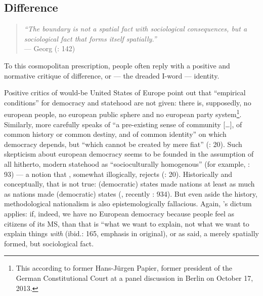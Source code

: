 \subsection[Difference]{Difference} \label{sec:ID-Difference} 

\begin{quote}
	\emph{``The boundary is not a spatial fact with sociological consequences, but a sociological fact that forms itself spatially.''} \\
	--- Georg \citeauthor{Simmel1903} (\citeyear{Simmel1903}: 142)
\end{quote}

To this cosmopolitan prescription, people often reply with a positive and normative critique of difference, or --- the dreaded I-word --- identity. 

Positive critics of would-be United States of Europe point out that ``empirical conditions'' for democracy and statehood are not given: there is, supposedly, no european people, no european public sphere and no european party system\footnote{
	This according to former Hans-J\"{u}rgen Papier, former president of the German Constitutional Court at a panel discussion in Berlin on October 17, 2013.}.
Similarly, \citeauthor{Scharpf1997} more carefully 	speaks of ``a pre-existing sense of community [\ldots], of common history or common destiny, and of common identity'' on which democracy depends, but ``which cannot be created by mere fiat'' (\citeyear{Scharpf1997}: 20).
Such skepticism about european democracy seems to be founded in the assumption of all hitherto, modern statehood as ``socioculturally homogenous'' (for example, \citealt{BeckGrande-2007-aa}: 93) --- a notion that \citeauthor{Scharpf1997}, somewhat illogically, rejects (\citeyear{Scharpf1997}: 20). Historically and conceptually, that is not true: (democratic) states made nations at least as much as nations made (democratic) states (\citealt{Gellner-1983-aa}, recently \citealt{Schmitter1999}: 934). But even aside the history, methodological nationalism is also epistemologically fallacious. Again, \citeauthor{Brubaker-2002-aa}'s dictum applies: if, indeed, we have no European democracy because people feel as citizens of its \gls{MS}, than that is ``what we want to explain, not what we want to explain things \emph{with} (ibid.: 165, emphasis in original), or as \citeauthor{Simmel1903} said, a merely spatially formed, but sociological fact.

